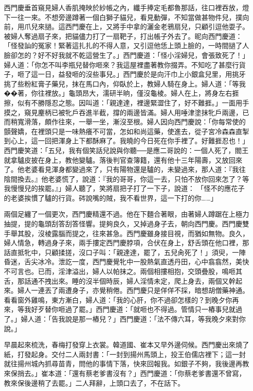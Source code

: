 西門慶垂首窺見婦人香肌掩映於紗帳之內，纖手捧定毛都魯那話，往口裡吞放，燈下一往一來。不想旁邊蹲著一個白獅子貓兒，看見動彈，不知當做甚物件兒，撲向前，用爪兒來撾。這西門慶在上，又將手中拿的灑金老鴉扇兒，只顧引逗他耍子。被婦人奪過扇子來，把貓儘力打了一扇靶子，打出帳子外去了。昵向西門慶道： 「怪發訕的冤家！緊著這扎扎的不得人意，又引逗他恁上頭上臉的，一時間撾了人臉卻怎的？好不好我就不乾這營生了。」西門慶道：「怪小淫婦兒，會張致死了！」婦人道：「你怎不叫李瓶兒替你咂來？我這屋裡盡著教你掇弄。不知吃了甚麼行貨子，咂了這一日，益發咂的沒些事兒。」西門慶於是向汗巾上小銀盒兒里，用挑牙挑了些粉紅膏子藥兒，抹在馬口內，仰臥於上，教婦人騎在身上。婦人道：「等我��著，你往裡放。」龜頭昂大，濡研半晌，僅沒龜棱。婦人在上，將身左右捱擦，似有不勝隱忍之態。因叫道：「親達達，裡邊緊澀住了，好不難捱。」一面用手摸之，窺見麈柄已被牝戶吞進半截，撐的兩邊皆滿。婦人用唾津塗抹牝戶兩邊，已而稍寬滑落，頗作往來，一舉一坐，漸沒至根。婦人因向西門慶說：「你每常使的顫聲嬌，在裡頭只是一味熱癢不可當，怎如和尚這藥，使進去，從子宮冷森森直掣到心上，這一回把渾身上下都酥麻了。我曉的今日死在你手裡了。好難捱忍也！」西門慶笑道：「五兒，我有個笑話兒說與你聽──是應二哥說的：一個人死了，閻王就拿驢皮披在身上，教他變驢。落後判官查簿籍，還有他十三年陽壽，又放回來了。他老婆看見渾身都變過來了，只有陽物還是驢的，未變過來，那人道：『我往陰間換去。』他老婆慌了，說道：『我的哥哥，你這一去，只怕不放你回來怎了？等我慢慢兒的挨罷。』」婦人聽了，笑將扇把子打了一下子，說道： 「怪不的應花子的老婆挨慣了驢的行貨。硶說嘴的賊，我不看世界，這一下打的你……」

兩個足纏了一個更次，西門慶精還不過。他在下麵合著眼，由著婦人蹲踞在上極力抽提，提的龜頭刮答刮答怪響。提夠良久，又掉過身子去，朝向西門慶。西門慶雙手舉其股，沒棱露腦而提之，往來甚急。西門慶雖身接目視，而猶如無物。良久，婦人情急，轉過身子來，兩手摟定西門慶脖項，合伏在身上，舒舌頭在他口裡，那話直抵牝中，只顧揉搓，沒口子叫：「親達達，罷了，五兒肏死了！」須臾，一陣昏迷，舌尖冰冷。泄訖一度，西門慶覺牝中一股熱氣直透丹田，心中翕翕然，美快不可言也。已而，淫津溢出，婦人以帕抹之。兩個相摟相抱，交頭疊股，鳴咂其舌，那話通不拽出來。睡的沒半個時辰，婦人淫情未定，爬上身去，兩個又幹起來。婦人一連丟了兩遭身子，亦覺稍倦。西門慶只是佯佯不採，暗想胡僧藥神通。看看窗外雞鳴，東方漸白，婦人道：「我的心肝，你不過卻怎樣的？到晚夕你再來，等我好歹替你咂過了罷。」西門慶道：「就咂也不得過。管情只一樁事兒就過了。」婦人道：「告我說是那一樁兒？」西門慶道：「法不傳六耳，等我晚夕來對你說。」

早晨起來梳洗，春梅打發穿上衣裳。韓道國、崔本又早外邊伺候。西門慶出來燒了紙，打發起身。交付二人兩封書：「一封到揚州馬頭上，投王伯儒店裡下；這一封就往揚州城內抓尋苗青，問他的事情下落，快來回報我。如銀子不夠，我後邊再教來保捎去。」崔本道：「還有蔡老爹書沒有？」西門慶道：「你蔡老爹書還不曾寫，教來保後邊稍了去罷。」二人拜辭，上頭口去了，不在話下。

